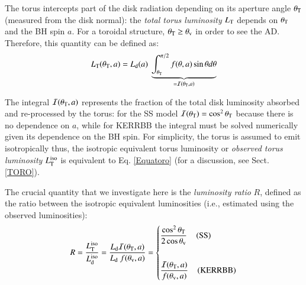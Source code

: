 \documentclass[]{aa}
\begin{document}
The torus intercepts part of the disk radiation depending on its aperture angle $\theta_{\rm T}$ (measured from the disk normal): the \textit{total torus luminosity} $L_{\rm T}$ depends on $\theta_{\rm T}$ and the BH spin $a$. For a toroidal structure, $\theta_{\rm T} \geq \theta_{\rm v}$ in order to see the AD. Therefore, this quantity can be defined as:
\begin{equation}\label{Equatoro}
	L_{\rm T}(\theta_{\rm T}, a) = L_{\rm d}(a)\ \underbrace{\int^{\pi/2}_{\theta_{\rm T}} f(\theta, a) \sin \theta d \theta}_{= \mathcal{I}(\theta_{\rm T},a)}
\end{equation}

The integral $\mathcal{I}(\theta_{\rm T},a)$ represents the fraction of the total disk luminosity absorbed and re-processed by the torus: for the SS model $\mathcal{I}(\theta_{\rm T}) = \cos^2 \theta_{\rm T}$ because there is no dependence on $a$, while for KERRBB the integral must be solved numerically given its dependence on the BH spin. For simplicity, the torus is assumed to emit isotropically thus, the isotropic equivalent torus luminosity or \textit{observed torus luminosity} $L^{\rm iso}_{\rm T}$ is equivalent to Eq. \ref{Equatoro} (for a discussion, see Sect. \ref{TORO}).

The crucial quantity that we investigate here is the \textit{luminosity ratio} $R$, defined as the ratio between the isotropic equivalent luminosities (i.e., estimated using the observed luminosities):
\begin{equation}\label{eq_ratio}
	R = \frac{L^{\rm iso}_{\rm T}}{L^{\rm iso}_{\rm d}} = \frac{L_{\rm d} \mathcal{I}(\theta_{\rm T}, a)}{L_{\rm d}\ f(\theta_{\rm v}, a)} = \begin{dcases} \frac{\cos^2 \theta_{\rm T}}{2 \cos \theta_{\rm v}}\ \hspace{3mm} ({\rm SS}) \\ \\ \frac{\mathcal{I}(\theta_{\rm T}, a)}{f(\theta_{\rm v}, a)}\ \hspace{3mm} ({\rm KERRBB}) \end{dcases}
\end{equation}
\end{document}
